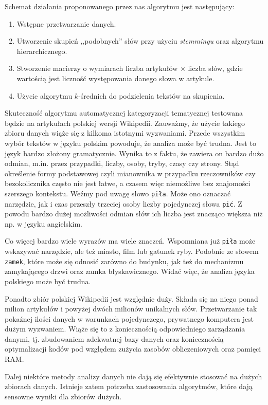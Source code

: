 \documentclass{praca1}
\begin{document}
Schemat działania proponowanego przez nas algorytmu jest następujący:
\begin{enumerate}
\item Wstępne przetwarzanie danych.
\item Utworzenie skupień ,,podobnych'' słów przy użyciu \emph{stemmingu} oraz algorytmu hierarchicznego.
\item Stworzenie macierzy o wymiarach liczba artykułów $\times$ liczba słów, gdzie wartością jest liczność występowania danego słowa w artykule.
\item Użycie algorytmu $k$-średnich do podzielenia tekstów na skupienia.
\end{enumerate}

Skuteczność algorytmu automatycznej kategoryzacji tematycznej testowana będzie na artykułach polskiej wersji Wikipedii. Zauważmy, że użycie takiego zbioru danych wiąże się z kilkoma istotnymi wyzwaniami. Przede wszystkim wybór tekstów w języku polskim powoduje, że analiza może być trudna. Jest to język bardzo złożony gramatycznie. Wynika to z faktu, że zawiera on bardzo dużo odmian, m.in. przez przypadki, liczby, osoby, tryby, czasy czy strony. Stąd określenie formy podstawowej czyli mianownika w przypadku rzeczowników czy bezokolicznika często nie jest łatwe, a czasem więc niemożliwe bez znajomości szerszego kontekstu. Weźmy pod uwagę słowo \verb|piła|. Może ono oznaczać narzędzie, jak i czas przeszły trzeciej osoby liczby pojedynczej słowa \verb|pić|. Z powodu bardzo dużej możliwości odmian słów ich liczba jest znacząco większa niż np. w języku angielskim. 

Co więcej bardzo wiele wyrazów ma wiele znaczeń. Wspomniana już \verb|piła| może wskazywać narzędzie, ale też miasto, film lub gatunek ryby. Podobnie ze słowem \verb|zamek|, które może się odnosić zarówno do budynku, jak też do mechanizmu zamykającego drzwi oraz zamka błyskawicznego. Widać więc, że analiza języka polskiego może być trudna.

Ponadto zbiór polskiej Wikipedii jest względnie duży. Składa się na niego ponad milion artykułów i powyżej dwóch milionów unikalnych słów. Przetwarzanie tak pokaźnej ilości danych w warunkach pojedynczego, prywatnego komputera jest dużym wyzwaniem. Wiąże się to z koniecznością odpowiedniego zarządzania danymi, tj. zbudowaniem adekwatnej bazy danych oraz koniecznością optymalizacji kodów pod względem zużycia zasobów obliczeniowych oraz pamięci RAM.

Dalej niektóre metody analizy danych nie dają się efektywnie stosować na dużych zbiorach danych. Istnieje zatem potrzeba zastosowania algorytmów, które dają sensowne wyniki dla zbiorów dużych. 
\end{document}
